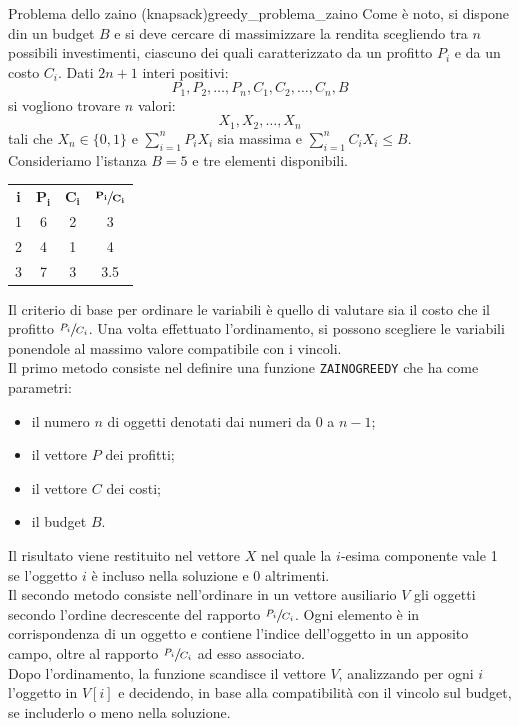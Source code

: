 \documentclass[12pt]{report}
\newcommand{\nmu}{}
\begin{document}
 	\begin{example}{\nmu Problema dello zaino (knapsack)}{greedy_problema_zaino}
 	Come è noto, si dispone din un budget $B$ e si deve cercare di massimizzare la rendita scegliendo tra $n$ possibili investimenti, ciascuno dei quali caratterizzato da un profitto $P_i$ e da un costo $C_i$. Dati $2n + 1$ interi positivi:
 	\[
 	P_1, P_2, \dots, P_n, C_1, C_2, \dots, C_n, B
 	\]
 	si vogliono trovare $n$ valori:
 	\[
 	X_1, X_2, \dots, X_n
 	\]
 	tali che $X_n \in \{0, 1\}$ e $\sum_{i=1}^{n}P_iX_i$ sia massima e $\sum_{i=1}^{n}C_iX_i \leq B$. \\
 	Consideriamo l'istanza $B = 5$ e tre elementi disponibili.
 	\begin{center}
	 	\begin{tabular}{|c|c|c|c|}
	 		\textbf{i} & $\mathbf{P_i}$ & $\mathbf{C_i}$ & $\mathbf{\sfrac{P_i}{C_i}}$ \\
	 		1 & 6 & 2 & 3 \\
	 		2 & 4 & 1 & 4 \\
	 		3 & 7 & 3 & 3.5
	 	\end{tabular}
 	\end{center}
 	Il criterio di base per ordinare le variabili è quello di valutare sia il costo che il profitto $\sfrac{P_i}{C_i}$. Una volta effettuato l'ordinamento, si possono scegliere le variabili ponendole al massimo valore compatibile con i vincoli. \\
 	Il primo metodo consiste nel definire una funzione \texttt{ZAINOGREEDY} che ha come parametri:
 	\begin{itemize}
 		\item il numero $n$ di oggetti denotati dai numeri da 0 a $n - 1$;
 		\item il vettore $P$ dei profitti;
 		\item il vettore $C$ dei costi;
 		\item il budget $B$.
 	\end{itemize}
 	Il risultato viene restituito nel vettore $X$ nel quale la $i$-esima componente vale 1 se l'oggetto $i$  è incluso nella soluzione e 0 altrimenti. \\
 	Il secondo metodo consiste nell'ordinare in un vettore ausiliario $V$ gli oggetti secondo l'ordine decrescente del rapporto $\sfrac{P_i}{C_i}$. Ogni elemento è in corrispondenza di un oggetto e contiene l'indice dell'oggetto in un apposito campo, oltre al rapporto $\sfrac{P_i}{C_i}$ ad esso associato. \\
 	Dopo l'ordinamento, la funzione scandisce il vettore $V$, analizzando per ogni $i$ l'oggetto in $V[i]$  e decidendo, in base alla compatibilità con il vincolo sul budget, se includerlo o meno nella soluzione.
 \end{example}
\end{document}
